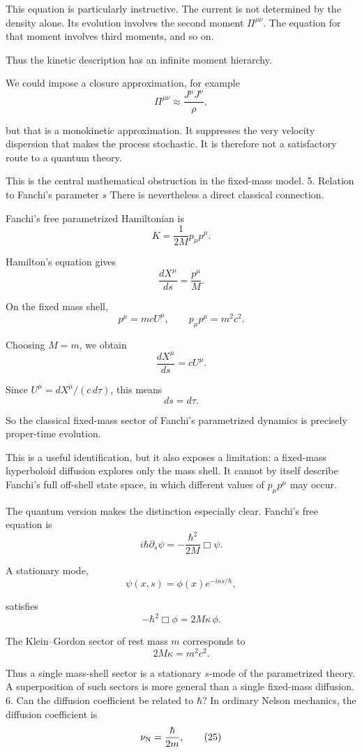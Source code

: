 This equation is particularly instructive. The current is not determined by the density alone. Its evolution involves the second moment \(\Pi^{\mu\nu}\). The equation for that moment involves third moments, and so on.

Thus the kinetic description has an infinite moment hierarchy.

We could impose a closure approximation, for example
\[
\Pi^{\mu\nu}\approx
\frac{J^\mu J^\nu}{\rho},
\tag{16}
\]

but that is a monokinetic approximation. It suppresses the very velocity dispersion that makes the process stochastic. It is therefore not a satisfactory route to a quantum theory.

This is the central mathematical obstruction in the fixed-mass model.
5. Relation to Fanchi's parameter \(s\)
There is nevertheless a direct classical connection.

Fanchi's free parametrized Hamiltonian is
\[
K=\frac{1}{2M}p_\mu p^\mu.
\tag{17}
\]

Hamilton's equation gives
\[
\frac{dX^\mu}{ds}=\frac{p^\mu}{M}.
\tag{18}
\]

On the fixed mass shell,
\[
p^\mu=mcU^\mu,\qquad p_\mu p^\mu=m^2c^2.
\tag{19}
\]

Choosing \(M=m\), we obtain
\[
\frac{dX^\mu}{ds}=cU^\mu.
\tag{20}
\]

Since \(U^\mu= dX^\mu/(c\,d\tau)\), this means
\[
\boxed{ds=d\tau.}
\tag{21}
\]

So the classical fixed-mass sector of Fanchi's parametrized dynamics is precisely proper-time evolution.

This is a useful identification, but it also exposes a limitation: a fixed-mass hyperboloid diffusion explores only the mass shell. It cannot by itself describe Fanchi's full off-shell state space, in which different values of \(p_\mu p^\mu\) may occur.

The quantum version makes the distinction especially clear. Fanchi's free equation is
\[
i\hbar\partial_s\psi
=-\frac{\hbar^2}{2M}\Box\psi.
\tag{22}
\]

A stationary mode,
\[
\psi(x,s)=\phi(x)e^{-i\kappa s/\hbar},
\]

satisfies
\[
-\hbar^2\Box\phi=2M\kappa\,\phi.
\tag{23}
\]

The Klein–Gordon sector of rest mass \(m\) corresponds to
\[
2M\kappa=m^2c^2.
\tag{24}
\]

Thus a single mass-shell sector is a stationary \(s\)-mode of the parametrized theory. A superposition of such sectors is more general than a single fixed-mass diffusion.
6. Can the diffusion coefficient be related to \(\hbar\)?
In ordinary Nelson mechanics, the diffusion coefficient is
\[
\nu_{\rm N}=\frac{\hbar}{2m},
\tag{25}
\]

